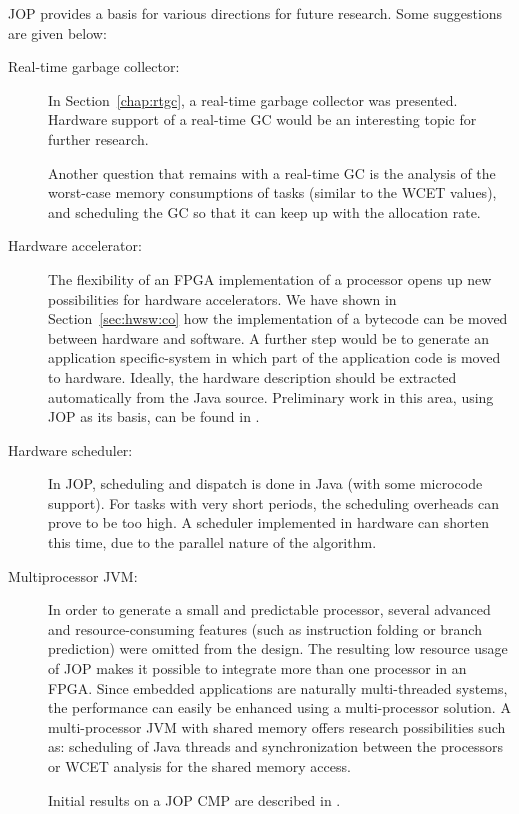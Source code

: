 JOP provides a basis for various directions for future research.
Some suggestions are given below:
%
\begin{description}
    \item[Real-time garbage collector:]
In Section~\ref{chap:rtgc}, a real-time garbage collector was
presented. Hardware support of a real-time GC would be an
interesting topic for further research.

Another question that remains with a real-time GC is the analysis of
the worst-case memory consumptions of tasks (similar to the WCET
values), and scheduling the GC so that it can keep up with the
allocation rate.

    \item[Hardware accelerator:]
The flexibility of an FPGA implementation of a processor opens up
new possibilities for hardware accelerators. We have shown in
Section~\ref{sec:hwsw:co} how the implementation of a bytecode can
be moved between hardware and software. A further step would be to
generate an application specific-system in which part of the
application code is moved to hardware. Ideally, the hardware
description should be extracted automatically from the Java source.
Preliminary work in this area, using JOP as its basis, can be found
in \cite{jop:sac05}.

    \item[Hardware scheduler:]
In JOP, scheduling and dispatch is done in Java (with some microcode
support). For tasks with very short periods, the scheduling
overheads can prove to be too high. A scheduler implemented in
hardware can shorten this time, due to the parallel nature of the
algorithm.

    \item[Multiprocessor JVM:] In order to generate a small and
        predictable processor, several advanced and
        resource-consuming features (such as instruction folding
        or branch prediction) were omitted from the design. The
        resulting low resource usage of JOP makes it possible to
        integrate more than one processor in an FPGA. Since
        embedded applications are naturally multi-threaded
        systems, the performance can easily be enhanced using a
        multi-processor solution. A multi-processor JVM with
        shared memory offers research possibilities such as:
        scheduling of Java threads and synchronization between
        the processors or WCET analysis for the shared memory
        access.

Initial results on a JOP CMP are described in \cite{jop:dma,
jop:cmp}.


\end{description}
